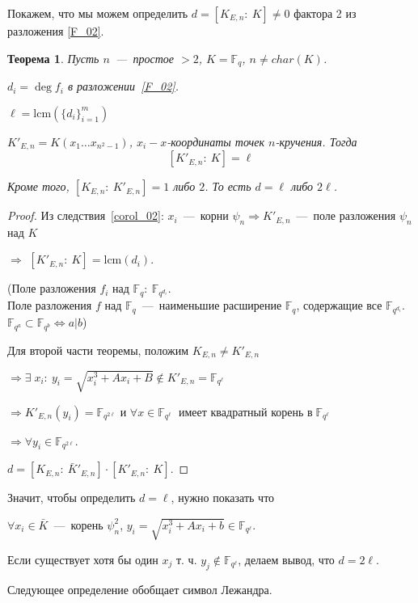 \documentclass[12pt]{article}
\newcommand{\F}{{{\mathbb F}}}
\newtheorem{theorem}{Теорема}
\theoremstyle{definition}
\theoremstyle{definition}
\theoremstyle{definition}
\begin{document}
Покажем, что мы можем определить $d = [ {{K_{E,n}}:\:K} ] \ne 0$ фактора 2 из разложения \ref{F_02}. 

\begin{theorem}
	Пусть $n$~---~простое $> 2$, $K = {\F_q}$, $n \ne char( K )$.
	
	${d_i} = \deg {f_i}$ в разложении~\eqref{F_02}.
	
	$\ell = \mathrm{lcm}( {\{ {{d_i}} \}_{i = 1}^m} )$
	
	$K'_{E,n} = K( {{x_1} \ldots {x_{{n^2} - 1}}}) $, ${x_i} - x$-координаты точек $n$-кручения. Тогда 
	$$[ {K'_{E,n}:\:K} ] = \ell
	$$
	
	Кроме того, $[ {{K_{E,n}}:\:K'_{E,n}} ] = 1$ либо $2$. То есть $d = \ell$ либо $2\ell$. 
\end{theorem}
\begin{proof}
    Из следствия~\ref{corol_02}: $x_i$~---~корни ${\psi _n} \Rightarrow K'_{E,n}$~---~поле разложения ${\psi _n}$ над $K$
    
    $ \Rightarrow $ $[ {K{'_{E,n}}:\:K} ] = \mathrm{lcm}( {{d_i}} )$.
    
    (Поле разложения $f_i$ над ${\F_q}:\:\F_{q^{d_i}}$. \\
    Поле разложения $f$ над ${\F_q}$~---~наименьшие расширение ${\F_q}$, содержащие все ${\F_{q^{d_i}}}$. \\
    $\F_{q^a} \subset {\F_{q^b}} \Leftrightarrow a | b $)
    
    Для второй части теоремы, положим ${K_{E,n}} \ne K'_{E,n}$
    
    $ \Rightarrow \exists \; {x_i}:\:{y_i} = \sqrt {x_i^3 + A{x_i} + B}  \notin K'_{E,n} = {\F_{{q^\ell}}}$
    
    $ \Rightarrow K{'_{E,n}}(y_i) = \F_{q^{2\ell}}$ и $\forall x \in \F_{q^\ell}$ $\mathop {{\text{ имеет квадратный корень в }}} \F_{q^\ell}$
    
    $ \Rightarrow \forall {y_i} \in \F_{q^{2\ell}}$.
    
    $d = [ {{K_{E,n}}:\:\bar K'_{E,n}} ] \cdot [ {K'_{E,n}:\:K} ].$
\end{proof}

Значит, чтобы определить $d = \ell$, нужно показать что 

$\forall {x_i} \in \bar K$~---~корень $\psi _n^2$, ${y_i} = \sqrt {x_i^3 + A{x_i} + b} \in  \F_{q^\ell}$. 

Если существует хотя бы один ${x_j}$ т. ч. ${y_j} \notin \F_{q^\ell}$, делаем вывод, что $d = 2\ell$.

Следующее определение обобщает символ Лежандра.
\end{document}
